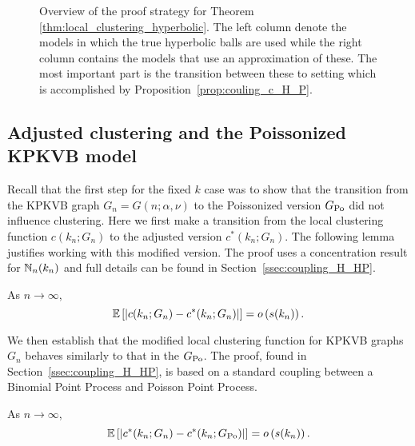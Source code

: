 \begin{figure}[!t]

\caption{Overview of the proof strategy for Theorem \ref{thm:local_clustering_hyperbolic}. The left column denote the models in which the true hyperbolic balls are used while the right column contains the models that use an approximation of these. The most important part is the transition between these to setting which is accomplished by Proposition~\ref{prop:couling_c_H_P}.}
\label{fig:overview_proof}
\end{figure}


\subsection{Adjusted clustering and the Poissonized KPKVB model}\label{ssec:KPKVB_to_GPo_infinite_k}

Recall that the first step for the fixed $k$ case was to show that the transition from the KPKVB graph $G_n = G(n;\alpha,\nu)$ to the Poissonized version $G_{\text{Po}}$ did not influence clustering. Here we first make a transition from the local clustering function $c(k_n; G_n)$ to the adjusted version $c^\ast(k_n; G_n)$. The following lemma justifies working with this modified version. The proof uses a concentration result for $\mathbb{N}_{n}(k_n)$ and full details can be found in Section~\ref{ssec:coupling_H_HP}.

\begin{lemma}\label{lem:clustering_ast_H}
As $n \to \infty$,
\[
	\mathbb{E}\left[\left|c(k_n;G_n) - c^\ast(k_n;G_n)\right|\right] = o\left(s(k_n)\right).
\]
\end{lemma}

We then establish that the modified local clustering function for KPKVB graphs $G_n$ behaves similarly to that in the $G_{\text{Po}}$. The proof, found in Section~\ref{ssec:coupling_H_HP}, is based on a standard coupling between a Binomial Point Process and Poisson Point Process.

\begin{proposition}\label{prop:clustering_ast_H_Pois}
As $n \to \infty$,
\[
	\mathbb{E}\left[\left|c^\ast(k_n;G_n) - c^\ast(k_n; G_{\text{Po}})\right|\right] = o\left(s(k_n)\right).
\]
\end{proposition}

